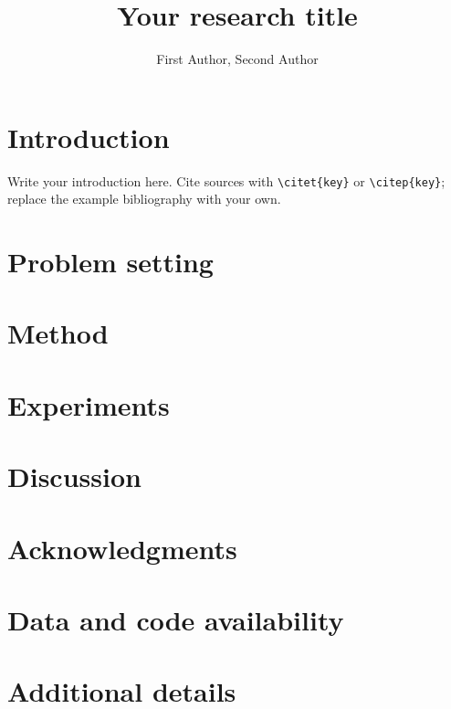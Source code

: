 \documentclass[11pt]{article}
\title{Your research title}
\author{First Author\affil{1}, Second Author\affil{1,2}}
\affil{2}Collaborating institution, City, Country}
\begin{document}
\maketitle

\section{Introduction}\label{sec:introduction}
Write your introduction here. Cite sources with \verb|\citet{key}| or
\verb|\citep{key}|; replace the example bibliography with your own.

\section{Problem setting}\label{sec:setting}

\section{Method}\label{sec:method}

\section{Experiments}\label{sec:experiments}

\section{Discussion}\label{sec:discussion}

\section*{Acknowledgments}

\section*{Data and code availability}

% 
% 

\clearpage
\appendix
\section{Additional details}\label{app:details}
\end{document}
